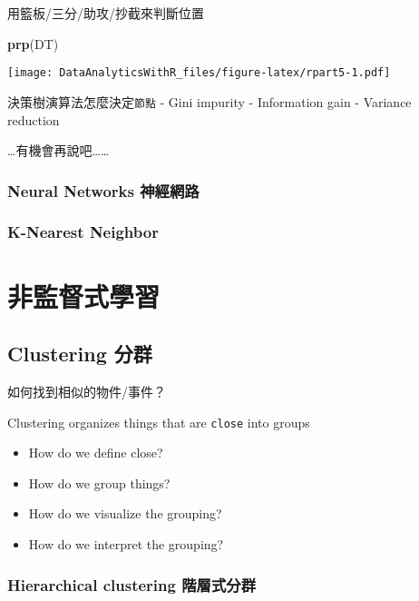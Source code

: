 \documentclass[]{book}
\newenvironment{Shaded}{\begin{snugshade}}{\end{snugshade}}
\newcommand{\KeywordTok}[1]{\textcolor[rgb]{0.13,0.29,0.53}{\textbf{{#1}}}}
\newcommand{\NormalTok}[1]{{#1}}
\providecommand{\tightlist}{%
  \setlength{\itemsep}{0pt}\setlength{\parskip}{0pt}}
\begin{document}
用籃板/三分/助攻/抄截來判斷位置

\begin{Shaded}
\begin{Highlighting}[]
\KeywordTok{prp}\NormalTok{(DT)}
\end{Highlighting}
\end{Shaded}

\texttt{[image: DataAnalyticsWithR\_files/figure-latex/rpart5-1.pdf]}

決策樹演算法怎麼決定\texttt{節點} - Gini impurity - Information gain -
Variance reduction

\ldots{}有機會再說吧\ldots{}\ldots{}

\subsubsection{Neural Networks 神經網路}\label{neural-networks-}

\subsubsection{K-Nearest Neighbor}\label{k-nearest-neighbor}

\section{非監督式學習}

\subsection{Clustering 分群}\label{clustering-}

如何找到相似的物件/事件？

Clustering organizes things that are \texttt{close} into groups

\begin{itemize}
\tightlist
\item
  How do we define close?
\item
  How do we group things?
\item
  How do we visualize the grouping?
\item
  How do we interpret the grouping?
\end{itemize}

\subsubsection{Hierarchical clustering
階層式分群}\label{hierarchical-clustering-}
\end{document}
